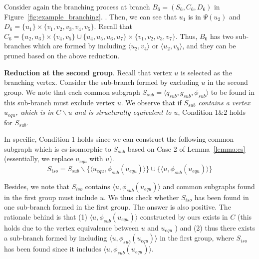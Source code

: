 \noindent{}

\begin{example}
        Consider again the branching process at branch $B_6=(S_6,C_6,D_6)$ in Figure~\ref{fig:example_branching}. . Then, we can see that $u_1$ is in $\Psi(u_2)$ and $D_{6}= \{u_1\} \times \{v_1,v_2,v_3,v_4,v_5\}$. {\YuiRR Recall that $C_6=\{u_2,u_3\}\times \{v_4,v_5\}\cup\{u_4,u_5,u_6,u_7\}\times\{v_1,v_2,v_3,v_7\}$. Thus, $B_6$ has two sub-branches which are formed by including $\langle u_2,v_4 \rangle$ or $\langle u_2,v_5 \rangle$, and they can be pruned based on the above reduction. }
\end{example}


\smallskip
\noindent\textbf{Reduction at the second group}. {\YuiR Recall that vertex $u$ is selected as the branching vertex.} Consider the sub-branch formed  {\YuiR by excluding $u$} in the second group. We note that {\chengC each} common subgraph $S_{sub}=\langle q_{sub},g_{sub},\phi_{sub} \rangle$ to be found in this sub-branch must exclude vertex $u$. We observe that if \emph{$S_{sub}$ contains a vertex $u_{equ}$, {\chengC which} is in $C\backslash u$ and is structurally equivalent to $u$}, Condition 1\&2 holds for $S_{sub}$. 

In specific, Condition 1 holds {\chengC since we can construct the} following common subgraph {\chengC which is} cs-isomorphic to $S_{sub}$ {\chengC based on} Case 2 of Lemma~\ref{lemma:cs} {\chengC (essentially, we replace $u_{equ}$ with $u$)}.
\begin{equation}
    \label{eq:iso2}
    S_{iso}= S_{sub}\backslash\{\langle u_{equ}, \phi_{sub}(u_{equ})\rangle\}\cup\{ \langle u,\phi_{sub}(u_{equ}) \rangle\}
\end{equation}

Besides, we note that $S_{iso}$ contains $\langle u,\phi_{sub}(u_{equ}) \rangle$ and common subgraphs found in the first group must include $u$. We thus {\chengC check} whether $S_{iso}$ has been found in one sub-branch formed in the first group. The answer is also positive. The rationale behind is that (1) $\langle u,\phi_{sub}(u_{equ}) \rangle$ constructed by ours exists in $C$ (this holds due to the vertex equivalence between $u$ and $u_{equ}$
) and (2) thus there exists a sub-branch formed by including $\langle u,\phi_{sub}(u_{equ}) \rangle$ in the first group, where $S_{iso}$ has been found since it includes $\langle u,\phi_{sub}(u_{equ}) \rangle$. 

